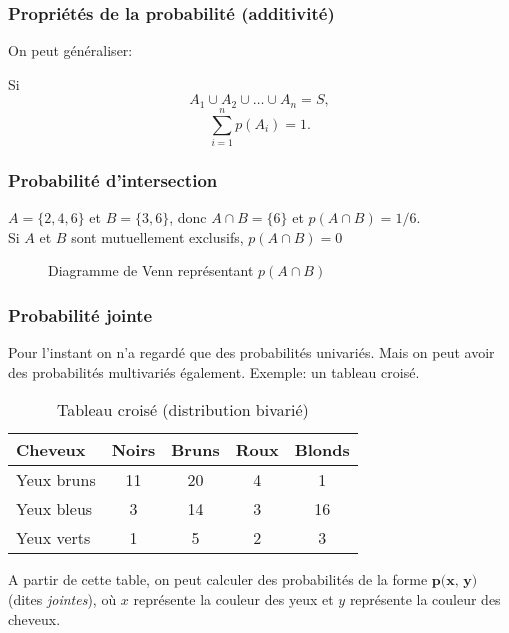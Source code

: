 \documentclass{beamer}
\begin{document}
\begin{frame}
    \frametitle{Propriétés de la probabilité (additivité)}
    On peut généraliser:

    \pause

    \vfill

    Si 
    \[A_1 \cup A_2 \cup \ldots \cup A_n = S,\]
    \[\sum_{i=1}^{n} p(A_i) = 1.\]
\end{frame}




\begin{frame}
    \frametitle{Probabilité d'intersection}
    $A = \{2,4,6\}$ et $B = \{3,6\}$, donc $A \cap B = \{6\}$ et $p(A \cap B) = 1/6$.\\
    \vfill
    \pause
    Si $A$ et $B$ sont mutuellement exclusifs, $p(A \cap B) = 0$    
    \begin{figure}
      \centering
      
      \caption{Diagramme de Venn représentant $p(A \cap B)$}
    \end{figure}
\end{frame}


\begin{frame}
    \frametitle{Probabilité jointe}
    Pour l'instant on n'a regardé que des probabilités univariés. Mais on peut avoir des probabilités multivariés également.
    Exemple: un tableau croisé.
    \pause
    \begin{table}[h!]
      \centering
      \begin{tabular}{|l|c|c|c|c|}
        \hline
        Cheveux & Noirs & Bruns & Roux & Blonds \\
        \hline\hline
        Yeux bruns & 11 & 20 & 4 & 1 \\
        Yeux bleus & 3 & 14 & 3 & 16 \\
        Yeux verts & 1 & 5 & 2 & 3 \\
        \hline
      \end{tabular}
      \caption{Tableau croisé (distribution bivarié)}
    \end{table}
    \pause
    A partir de cette table, on peut calculer des probabilités de la forme $\textbf{p(x, y)}$ (dites \emph{jointes}),
    où $x$ représente la couleur des yeux et $y$ représente la couleur des cheveux.
\end{frame}
\end{document}
